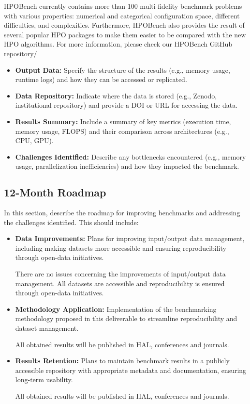 HPOBench currently contains more than 100 multi-fidelity benchmark problems with various properties: numerical and categorical configuration space, different difficulties, and complexities. Furthermore, HPOBench also provides the result of several popular HPO packages to make them easier to be compared with the new HPO algorithms. For more information, please check our HPOBench GitHub repository/

\begin{itemize}
\item \textbf{Output Data:} Specify the structure of the results (e.g., memory usage, runtime logs) and how they can be accessed or replicated.

\item \textbf{Data Repository:} Indicate where the data is stored (e.g., Zenodo, institutional repository) and provide a DOI or URL for accessing the data.

\item \textbf{Results Summary:} Include a summary of key metrics (execution time, memory usage, FLOPS) and their comparison across architectures (e.g., CPU, GPU).

\item \textbf{Challenges Identified:} Describe any bottlenecks encountered (e.g., memory usage, parallelization inefficiencies) and how they impacted the benchmark.
\end{itemize}

\subsection{12-Month Roadmap}
\label{sec:WP5:Zellij:roadmap}

In this section, describe the roadmap for improving benchmarks and addressing the challenges identified. This should include:
\begin{itemize}

\item \textbf{Data Improvements:} Plans for improving input/output data management, including making datasets more accessible and ensuring reproducibility through open-data initiatives.

There are no issues concerning the improvements of input/output data management. All datasets are accessible and reproducibility is ensured through open-data initiatives.

\item \textbf{Methodology Application:} Implementation of the benchmarking methodology proposed in this deliverable to streamline reproducibility and dataset management.

All obtained results will be published in HAL, conferences and journals.

\item \textbf{Results Retention:} Plans to maintain benchmark results in a publicly accessible repository with appropriate metadata and documentation, ensuring long-term usability.

All obtained results will be published in HAL, conferences and journals.

\end{itemize}

